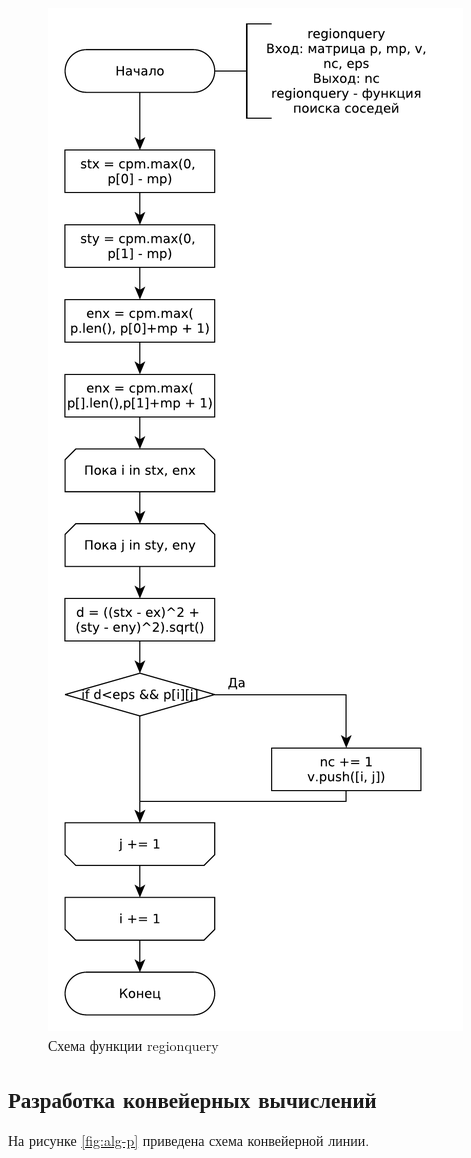\begin{figure}[ht!]
	\centering
	\includegraphics[width=0.5\linewidth]{assets/graphs/regionquery.pdf}
	\caption{Схема функции regionquery}
	\label{fig:alg2}
\end{figure}

\subsection{Разработка конвейерных вычислений}

На рисунке \ref{fig:alg-p} приведена схема конвейерной линии.

